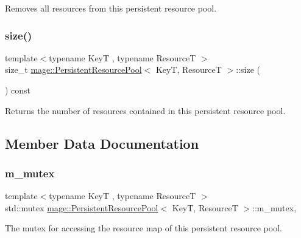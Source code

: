 Removes all resources from this persistent resource pool. \mbox{\label{classmage_1_1_persistent_resource_pool_a97dee6f5087b59f3e5b4fe14dca74b40}} 
\subsubsection{\texorpdfstring{size()}{size()}}
{\footnotesize\ttfamily template$<$typename KeyT , typename ResourceT $>$ \\
size\+\_\+t \mbox{\hyperlink{classmage_1_1_persistent_resource_pool}{mage\+::\+Persistent\+Resource\+Pool}}$<$ KeyT, ResourceT $>$\+::size (\begin{DoxyParamCaption}{ }\end{DoxyParamCaption}) const\hspace{0.3cm}{\ttfamily [noexcept]}}

Returns the number of resources contained in this persistent resource pool. 

\subsection{Member Data Documentation}
\mbox{\label{classmage_1_1_persistent_resource_pool_ac62c20842345306be0cddda2cb0d0524}} 
\subsubsection{\texorpdfstring{m\+\_\+mutex}{m\_mutex}}
{\footnotesize\ttfamily template$<$typename KeyT , typename ResourceT $>$ \\
std\+::mutex \mbox{\hyperlink{classmage_1_1_persistent_resource_pool}{mage\+::\+Persistent\+Resource\+Pool}}$<$ KeyT, ResourceT $>$\+::m\+\_\+mutex\hspace{0.3cm}{\ttfamily [mutable]}, {\ttfamily [private]}}

The mutex for accessing the resource map of this persistent resource pool. \mbox{\label{classmage_1_1_persistent_resource_pool_a9fec1e7492b5aea2a006b4e150289795}} 
